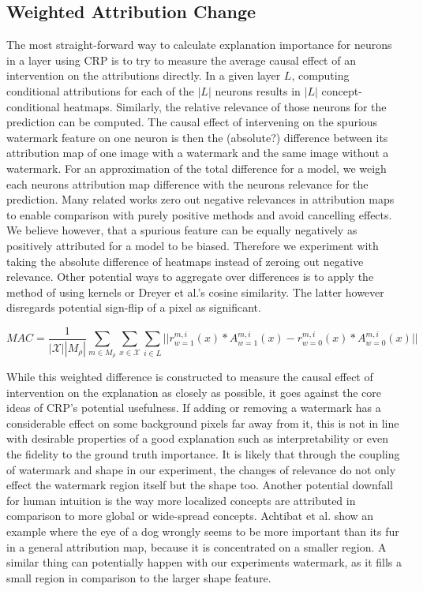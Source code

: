 \subsection{Weighted Attribution Change}
The most straight-forward way to calculate explanation importance for neurons in a layer using CRP is to try to measure the average causal effect of an intervention on the attributions directly. In a given layer $L$, computing conditional attributions for each of the $|L|$ neurons results in $|L|$ concept-conditional heatmaps. Similarly, the relative relevance of those neurons for the prediction can be computed.
The causal effect of intervening on the spurious watermark feature on one neuron is then the (absolute?) difference between its attribution map of one image with a watermark and the same image without a watermark. For an approximation of the total difference for a model, we weigh each neurons attribution map difference with the neurons relevance for the prediction. 
Many related works zero out negative relevances in attribution maps to enable comparison with purely positive methods and avoid cancelling effects. We believe however, that a spurious feature can be equally negatively as positively attributed for a model to be biased. Therefore we experiment with taking the absolute difference of heatmaps instead of zeroing out negative relevance. 
Other potential ways to aggregate over differences is to apply the method of \cite{Karimi2023} using kernels or Dreyer et al.'s \cite{Dreyer2023a} cosine similarity. The latter however disregards potential sign-flip of a pixel as significant. 

\begin{equation}
\displaystyle
    MAC = \frac{1}{|\mathcal{X}| |M_\rho|  } \sum_{m \in M_{\rho}} \sum_{x \in \mathcal{X}} \sum_{i \in L} || r_{w=1}^{m,i}(x) * A_{w=1}^{m,i}(x) -  r_{w=0}^{m,i}(x) * A_{w=0}^{m,i}(x)  ||
\end{equation}

While this weighted difference is constructed to measure the causal effect of intervention on the explanation as closely as possible, it goes against the core ideas of CRP's potential usefulness. If adding or removing a watermark has a considerable effect on some background pixels far away from it, this is not in line with desirable properties of a good explanation such as interpretability or even the fidelity to the ground truth importance. It is likely that through the coupling of watermark and shape in our experiment, the changes of relevance do not only effect the watermark region itself but the shape too. 
Another potential downfall for human intuition is the way more localized concepts are attributed in comparison to more global or wide-spread concepts. Achtibat et al. \cite{Achtibat2022} show an example where the eye of a dog wrongly seems to be more important than its fur in a general attribution map, because it is concentrated on a smaller region. A similar thing can potentially happen with our experiments watermark, as it fills a small region in comparison to the larger shape feature. 


